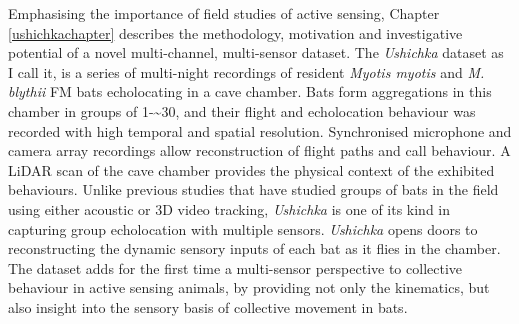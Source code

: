 \documentclass[
]{book}
\begin{document}
Emphasising the importance of field studies of active sensing, Chapter \ref{ushichkachapter} describes the methodology, motivation and investigative potential of a novel multi-channel, multi-sensor dataset. The \emph{Ushichka} dataset as I call it, is a series of multi-night recordings of resident \emph{Myotis myotis} and \emph{M. blythii} FM bats echolocating in a cave chamber. Bats form aggregations in this chamber in groups of 1-\textasciitilde30, and their flight and echolocation behaviour was recorded with high temporal and spatial resolution. Synchronised microphone and camera array recordings allow reconstruction of flight paths and call behaviour. A LiDAR scan of the cave chamber provides the physical context of the exhibited behaviours. Unlike previous studies that have studied groups of bats in the field using either acoustic or 3D video tracking, \emph{Ushichka} is one of its kind in capturing group echolocation with multiple sensors. \emph{Ushichka} opens doors to reconstructing the dynamic sensory inputs of each bat as it flies in the chamber. The dataset adds for the first time a multi-sensor perspective to collective behaviour in active sensing animals, by providing not only the kinematics, but also insight into the sensory basis of collective movement in bats.
\end{document}
